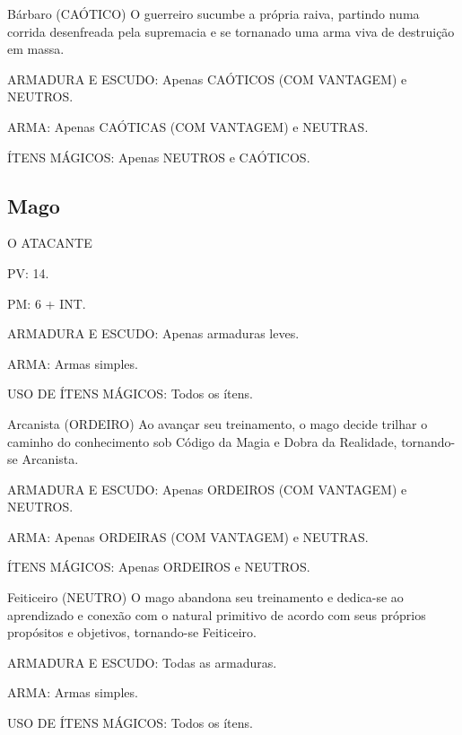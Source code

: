 \documentclass[10pt,twoside,twocolumn]{book}
\begin{document}
\begin{rpg-warnbox}{Bárbaro (CAÓTICO)}
	 O guerreiro sucumbe a própria raiva, partindo numa corrida desenfreada pela supremacia e se tornanado uma arma viva de destruição em massa.
    \begin{rpg-list}
      	\item ARMADURA E ESCUDO: Apenas CAÓTICOS (COM VANTAGEM) e NEUTROS.
    	\item ARMA: Apenas CAÓTICAS (COM VANTAGEM) e NEUTRAS.
    	\item ÍTENS MÁGICOS: Apenas NEUTROS e CAÓTICOS.
    \end{rpg-list}
\end{rpg-warnbox}

\subsection{Mago}
\begin{rpg-quotebox}{O ATACANTE}
      \begin{rpg-list}
       \item PV: 14.
       \item PM: 6 + INT.
       \item ARMADURA E ESCUDO: Apenas armaduras leves.
       \item ARMA: Armas simples.
       \item USO DE ÍTENS MÁGICOS: Todos os ítens.
  \end{rpg-list}
\end{rpg-quotebox}

\begin{rpg-suggestionbox}{Arcanista (ORDEIRO)}
Ao avançar seu treinamento, o mago decide trilhar o caminho do conhecimento sob Código da Magia e Dobra da Realidade, tornando-se Arcanista.
  \begin{rpg-list}
       \item ARMADURA E ESCUDO: Apenas ORDEIROS (COM VANTAGEM) e NEUTROS.
       \item ARMA: Apenas ORDEIRAS (COM VANTAGEM) e NEUTRAS.
       \item ÍTENS MÁGICOS: Apenas ORDEIROS e NEUTROS.
  \end{rpg-list}    
\end{rpg-suggestionbox}

\begin{rpg-commentbox}{Feiticeiro (NEUTRO)}
O mago abandona seu treinamento e dedica-se ao aprendizado e conexão com o natural primitivo de acordo com seus próprios propósitos e objetivos, tornando-se Feiticeiro.
    \begin{rpg-list}
      	\item ARMADURA E ESCUDO: Todas as armaduras.
    	\item ARMA: Armas simples.
    	\item USO DE ÍTENS MÁGICOS: Todos os ítens.
    \end{rpg-list}
\end{rpg-commentbox}
\end{document}
